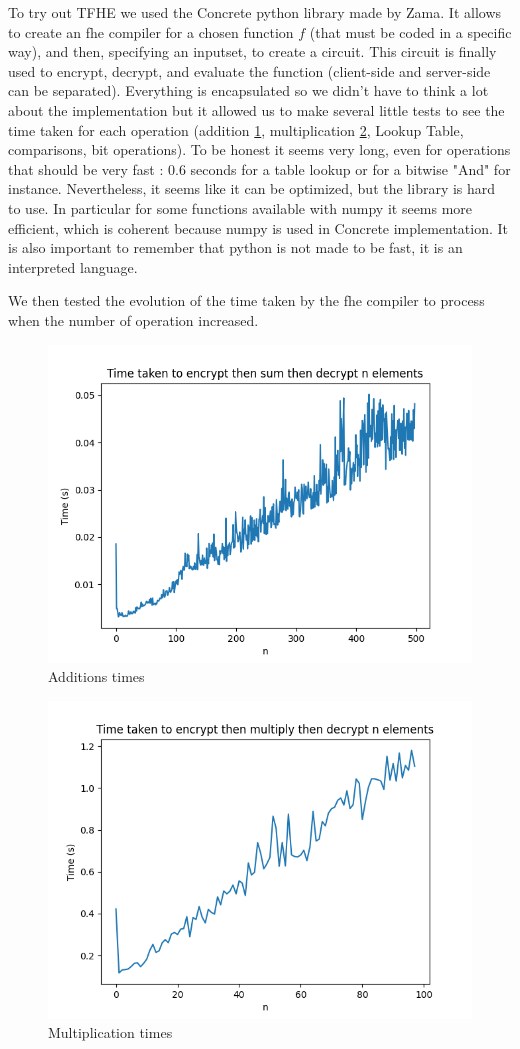 \documentclass{article}
\theoremstyle{definition}
\theoremstyle{Theorem}
\begin{document}
To try out TFHE we used the Concrete python library made by Zama. It allows to create an fhe compiler for a chosen function $f$ (that must be coded in a specific way), and then, specifying an inputset, to create a circuit. This circuit is finally used to encrypt, decrypt, and evaluate the function (client-side and server-side can be separated). Everything is encapsulated so we didn't have to think a lot about the implementation but it allowed us to make several little tests to see the time taken for each operation (addition \ref{fig:addition_time}, multiplication \ref{fig:multiplication_time}, Lookup Table, comparisons, bit operations). To be honest it seems very long, even for operations that should be very fast : 0.6 seconds for a table lookup or for a bitwise "And" for instance. Nevertheless, it seems like it can be optimized, but the library is hard to use. In particular for some functions available with numpy it seems more efficient, which is coherent because numpy is used in Concrete implementation. 
It is also important to remember that python is not made to be fast, it is an interpreted language. 

We then tested the evolution of the time taken by the fhe compiler to process when the number of operation increased. 


\begin{figure}[!ht]
    \centering
    \includegraphics[width=0.5\linewidth]{Figure_1.png}
    \caption{Additions times}
    \label{fig:addition_time}
\end{figure}

\begin{figure}[!ht]
    \centering
    \includegraphics[width=0.5\linewidth]{Figure_2.png}
    \caption{Multiplication times}
    \label{fig:multiplication_time}
\end{figure}
\end{document}
